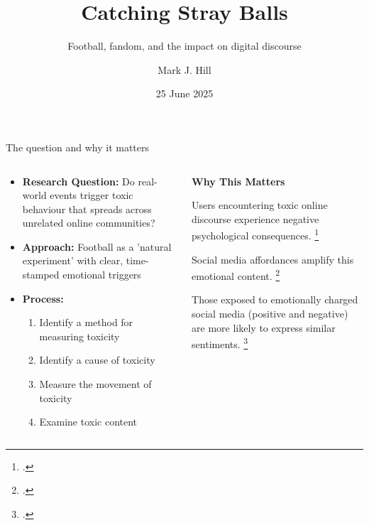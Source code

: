 \documentclass[10pt]{beamer}
\title{Catching Stray Balls}
\subtitle{Football, fandom, and the impact on digital discourse}
\date{25 June 2025}
\author{Mark J. Hill}
\institute{Department of Digital Humanities, KCL}
\begin{document}
\maketitle



\begin{frame}{The question and why it matters}

\begin{columns}
\begin{column}{0.55\textwidth}
\begin{itemize}
\item \textbf{Research Question:}
Do real-world events trigger toxic behaviour that spreads across unrelated online communities?
\item \textbf{Approach:} Football as a 'natural experiment' with clear, time-stamped emotional triggers

\item \textbf{Process:}
{\small
    \begin{enumerate}
    \item Identify a method for measuring toxicity
    \item Identify a cause of toxicity
    \item Measure the movement of toxicity
    \item Examine toxic content
    \end{enumerate}
}

\end{itemize}
\end{column}

\begin{column}{0.55\textwidth}
\textbf{Why This Matters}
\item Users encountering toxic online discourse experience negative psychological consequences. \footcite{braghieri_social_2022, allcott_welfare_2020}
\item Social media affordances amplify this emotional content. \footcite{milli_engagement_2025, kramer_experimental_2014, tsugawa_negative_2015} 
\item Those exposed to emotionally charged social media (positive and negative) are more likely to express similar sentiments. \footcite{ferrara_measuring_2015, Brady_2017}

\end{column}
\end{columns}
\end{frame}
\end{document}
